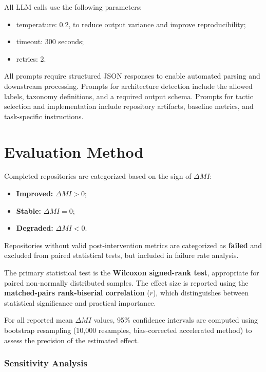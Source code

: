 All LLM calls use the following parameters:

\begin{itemize}
    \item temperature: 0.2, to reduce output variance and improve reproducibility;
    \item timeout: 300 seconds;
    \item retries: 2.
\end{itemize}

All prompts require structured JSON responses to enable automated parsing and downstream processing. Prompts for architecture detection include the allowed labels, taxonomy definitions, and a required output schema. Prompts for tactic selection and implementation include repository artifacts, baseline metrics, and task-specific instructions.

\section{Evaluation Method}
\label{sec:met_eval}

Completed repositories are categorized based on the sign of $\Delta MI$:

\begin{itemize}
    \item \textbf{Improved:} $\Delta MI > 0$;
    \item \textbf{Stable:} $\Delta MI = 0$;
    \item \textbf{Degraded:} $\Delta MI < 0$.
\end{itemize}

Repositories without valid post-intervention metrics are categorized as \textbf{failed} and excluded from paired statistical tests, but included in failure rate analysis.

The primary statistical test is the \textbf{Wilcoxon signed-rank test}, appropriate for paired non-normally distributed samples. The effect size is reported using the \textbf{matched-pairs rank-biserial correlation} ($r$), which distinguishes between statistical significance and practical importance.

For all reported mean $\Delta MI$ values, 95\% confidence intervals are computed using bootstrap resampling (10,000 resamples, bias-corrected accelerated method) to assess the precision of the estimated effect.

\subsubsection{Sensitivity Analysis}
\label{subsec:met_sensitivity}

